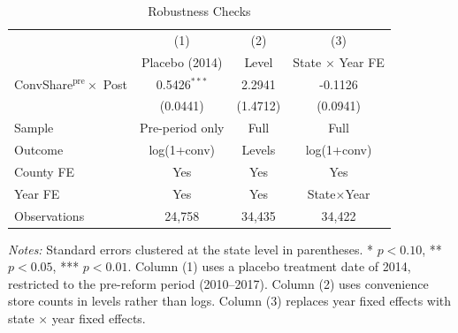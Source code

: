 
\begin{table}[H]
\centering
\caption{Robustness Checks}
\label{tab:robust}
\begin{threeparttable}
\begin{tabular}{lccc}
\toprule
& (1) & (2) & (3) \\
& Placebo (2014) & Level & State $\times$ Year FE \\
\midrule
ConvShare$^{\text{pre}} \times$ Post & 0.5426$^{***}$ & 2.2941 & -0.1126 \\
& (0.0441) & (1.4712) & (0.0941) \\[4pt]
Sample & Pre-period only & Full & Full \\
Outcome & log(1+conv) & Levels & log(1+conv) \\
County FE & Yes & Yes & Yes \\
Year FE & Yes & Yes & State$\times$Year \\
Observations & 24,758 & 34,435 & 34,422 \\
\bottomrule
\end{tabular}
\begin{tablenotes}[flushleft]
\small
\item \textit{Notes:} Standard errors clustered at the state level in parentheses. * $p<0.10$, ** $p<0.05$, *** $p<0.01$. Column (1) uses a placebo treatment date of 2014, restricted to the pre-reform period (2010--2017). Column (2) uses convenience store counts in levels rather than logs. Column (3) replaces year fixed effects with state $\times$ year fixed effects.
\end{tablenotes}
\end{threeparttable}
\end{table}

